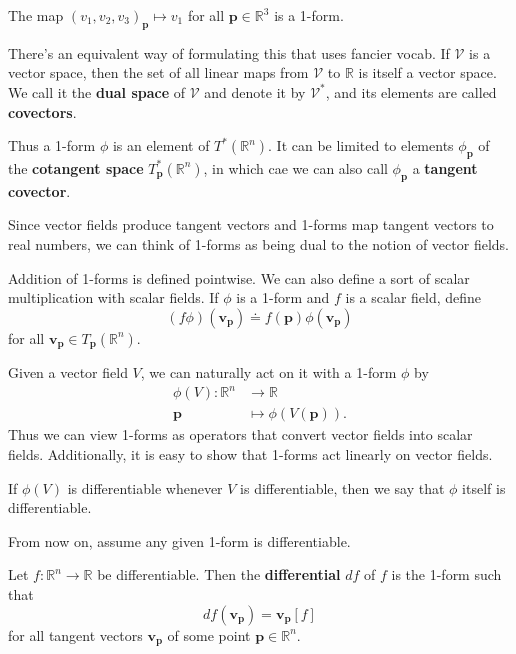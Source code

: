 \documentclass[10pt]{report}
\begin{document}
\begin{ex}
	The map $(v_1,v_2,v_3)_{\mathbf{p}}\mapsto v_1$ for all $\mathbf{p} \in \mathbb{R}^3$ is a 1-form.
\end{ex}

There's an equivalent way of formulating this that uses fancier vocab. If $\mathcal{V}$ is a vector space, then the set of all linear maps from $\mathcal{V}$ to $\mathbb{R}$ is itself a vector space. We call it the \textbf{dual space} of $\mathcal{V}$ and denote it by $\mathcal{V}^*$, and its elements are called \textbf{covectors}.

Thus a 1-form $\phi$ is an element of $T^*(\mathbb{R}^n)$. It can be limited to elements $\phi_\mathbf{p}$ of the \textbf{cotangent space} $T_{\mathbf{p}}^*(\mathbb{R}^n)$, in which cae we can also call $\phi_\mathbf{p}$ a \textbf{tangent covector}.

\begin{note}
Since vector fields produce tangent vectors and 1-forms map tangent vectors to real numbers, we can think of 1-forms as being dual to the notion of vector fields.
\end{note}

Addition of 1-forms is defined pointwise. We can also define a sort of scalar multiplication with scalar fields. If $\phi$ is a 1-form and $f$ is a scalar field, define
\[
	(f\phi)(\mathbf{v}_{\mathbf{p}}) \doteq f(\mathbf{p}) \phi(\mathbf{v}_\mathbf{p})
\] for all $\mathbf{v}_{\mathbf{p}} \in T_\mathbf{p}(\mathbb{R}^n)$.

Given a vector field $V$, we can naturally act on it with a 1-form $\phi$ by
\begin{align*}
	\phi(V):\mathbb{R}^n&\to \mathbb{R} \\
	\mathbf{p}&\mapsto \phi(V(\mathbf{p})).
\end{align*}
Thus we can view 1-forms as operators that convert vector fields into scalar fields. Additionally, it is easy to show that 1-forms act linearly on vector fields.

If $\phi(V)$ is differentiable whenever $V$ is differentiable, then we say that $\phi$ itself is differentiable.

\begin{note}
From now on, assume any given 1-form is differentiable.
\end{note}

\begin{defn}
Let $f:\mathbb{R}^n\to \mathbb{R}$ be differentiable. Then the \textbf{differential} $df$ of $f$ is the 1-form such that
\[
	df(\mathbf{v}_{\mathbf{p}}) = \mathbf{v}_{\mathbf{p}}[f]
\] for all tangent vectors $\mathbf{v}_{\mathbf{p}}$ of some point $\mathbf{p} \in \mathbb{R}^n$.
\end{defn}
\end{document}
